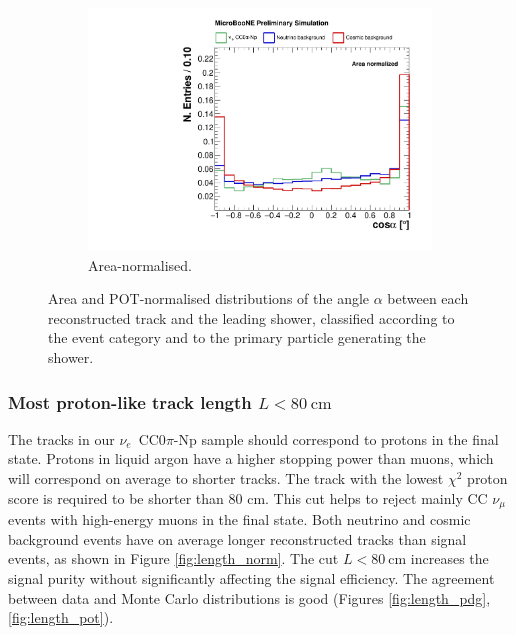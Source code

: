 \begin{figure}[htbp]
    \begin{subfigure}{0.49\textwidth}
    \includegraphics[width=\linewidth]{figures/h_track_shower_angle_norm.pdf}
    \caption{Area-normalised.} \label{fig:angle_integral}
  \end{subfigure}
  \caption{Area and POT-normalised distributions of the angle $\alpha$ between each reconstructed track and the leading shower, classified according to the event category and to the primary particle generating the shower.}
\end{figure}

\subsubsection*{Most proton-like track length $L < 80~\mathrm{cm}$}
The tracks in our $\nu_e$~CC0$\pi$-Np sample should correspond to protons in the final state. Protons in liquid argon have a higher stopping power than muons, which will correspond on average to shorter tracks. The track with the lowest $\chi^{2}$ proton score is required to be shorter than 80 cm. This cut helps to reject mainly CC $\nu_{\mu}$ events with high-energy muons in the final state. 
Both neutrino and cosmic background events have on average longer reconstructed tracks than signal events, as shown in Figure \ref{fig:length_norm}. The cut $L < 80~$cm increases the signal purity without significantly affecting the signal efficiency. The agreement between data and Monte Carlo distributions is good (Figures \ref{fig:length_pdg}, \ref{fig:length_pot}). %

